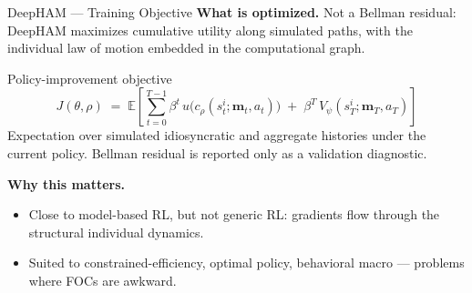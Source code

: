 \documentclass[aspectratio=169,11pt]{beamer}
\newcommand{\emphc}[1]{\textcolor{harvardcrimson}{#1}}
\begin{document}
\begin{frame}{DeepHAM --- Training Objective}
\small
\textbf{What is optimized.}  Not a Bellman residual: DeepHAM \emphc{maximizes cumulative utility} along simulated paths, with the individual law of motion embedded in the computational graph.

\vspace{0.4em}
\begin{block}{Policy-improvement objective}
\footnotesize
\begin{equation*}
J(\theta,\rho) \;=\; \mathbb{E}\!\left[\sum_{t=0}^{T-1}\beta^{t}\,u\!\bigl(c_\rho(s_t^i;\bm{m}_t,a_t)\bigr) \;+\; \beta^{T}\,V_\psi(s_T^i;\bm{m}_T,a_T)\right]
\end{equation*}
Expectation over simulated idiosyncratic and aggregate histories under the current policy.  Bellman residual is reported \emphc{only as a validation diagnostic}.
\end{block}

\vspace{0.3em}
\textbf{Why this matters.}
\begin{itemize}\itemsep1pt
    \item Close to model-based RL, but not generic RL: gradients flow through the structural individual dynamics.
    \item Suited to constrained-efficiency, optimal policy, behavioral macro --- problems where FOCs are awkward.
\end{itemize}
\end{frame}
\end{document}
